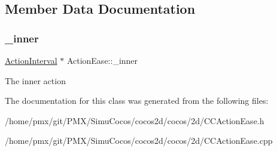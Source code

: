 \subsection{Member Data Documentation}
\mbox{\label{classActionEase_ae8717262cdb409d9810e5f7ac2478b98}} 
\subsubsection{\texorpdfstring{\+\_\+inner}{\_inner}}
{\footnotesize\ttfamily \hyperlink{classActionInterval}{Action\+Interval} $\ast$ Action\+Ease\+::\+\_\+inner\hspace{0.3cm}{\ttfamily [protected]}}

The inner action 

The documentation for this class was generated from the following files\+:\begin{DoxyCompactItemize}
\item 
/home/pmx/git/\+P\+M\+X/\+Simu\+Cocos/cocos2d/cocos/2d/C\+C\+Action\+Ease.\+h\item 
/home/pmx/git/\+P\+M\+X/\+Simu\+Cocos/cocos2d/cocos/2d/C\+C\+Action\+Ease.\+cpp\end{DoxyCompactItemize}
